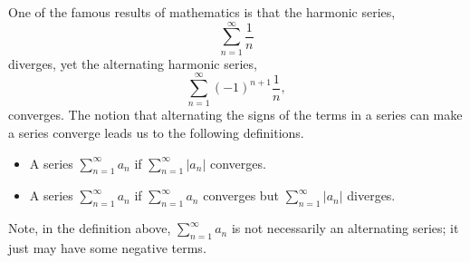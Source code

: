 \documentclass{ximera}
\begin{document}
One of the famous results of mathematics is that the harmonic series,
\[
\sum_{n=1}^\infty \frac1n
\]
diverges, yet the alternating harmonic series,
\[
\sum_{n=1}^\infty (-1)^{n+1}\frac1n,
\]
converges. The notion that alternating the signs of the terms in a
series can make a series converge leads us to the following
definitions.

\begin{definition}\hfil
\begin{itemize}
\item A series $\sum_{n=1}^\infty a_n$  if $\sum_{n=1}^\infty |a_n|$ converges.
\item A series $\sum_{n=1}^\infty a_n$  if $\sum_{n=1}^\infty a_n$ converges but $\sum_{n=1}^\infty |a_n|$ diverges.
\end{itemize}
\end{definition}

Note, in the definition above, $\sum_{n=1}^\infty a_n$ is not
necessarily an alternating series; it just may have some negative
terms.
\end{document}
